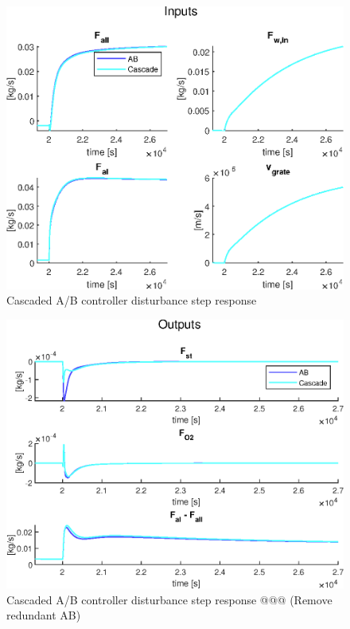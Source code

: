 \begin{figure}[!ht]
    \centering
    \includegraphics[width=\textwidth]{img/Fig_dump/inputs_ABCascadeStep_Q_all.eps}
    \caption{Cascaded A/B controller disturbance step response}
    \label{fig:cascade_controller_input_response}
\end{figure}




\begin{figure}[!ht]
    \centering
    \includegraphics[width=\textwidth]{img/Fig_dump/outputs_ABCascadeStep_Q_all.eps}
    \caption{Cascaded A/B controller disturbance step response @@@ (Remove redundant AB) }
    \label{fig:cascade_controller_output_response}
\end{figure}


